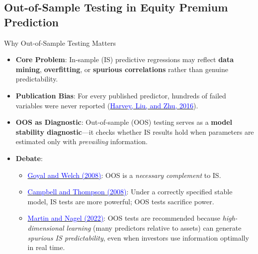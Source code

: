 \documentclass{beamer}
\begin{document}

\subsection{Out-of-Sample Testing in Equity Premium Prediction}

\begin{frame}{Why Out-of-Sample Testing Matters}
    \begin{itemize}
        \item \textbf{Core Problem}: In-sample (IS) predictive regressions may reflect \textbf{data mining}, \textbf{overfitting}, or \textbf{spurious correlations} rather than genuine predictability.
        \item \textbf{Publication Bias}: For every published predictor, hundreds of failed variables were never reported (\href{https://doi.org/10.1093/rfs/hhv059}{\textcolor{blue}{Harvey, Liu, and Zhu, 2016}}).
        \item \textbf{OOS as Diagnostic}: Out-of-sample (OOS) testing serves as a \textbf{model stability diagnostic}---it checks whether IS results hold when parameters are estimated only with \textit{prevailing} information.
        \item \textbf{Debate}:
        \begin{itemize}
            \item \href{https://doi.org/10.1093/rfs/hhm014}{\textcolor{blue}{Goyal and Welch (2008)}}: OOS is a \textit{necessary complement} to IS.
            \item \href{https://doi.org/10.1093/rfs/hhm055}{\textcolor{blue}{Campbell and Thompson (2008)}}: Under a correctly specified stable model, IS tests are more powerful; OOS tests sacrifice power.
            \item \href{https://doi.org/10.1016/j.jfineco.2021.10.006}{\textcolor{blue}{Martin and Nagel (2022)}}: OOS tests are recommended because \textit{high-dimensional learning} (many predictors relative to assets) can generate \textit{spurious IS predictability}, even when investors use information optimally in real time.
        \end{itemize}
    \end{itemize}
\end{frame}
\end{document}
